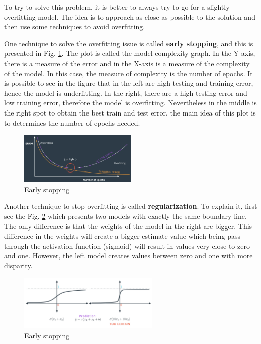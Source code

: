 \documentclass{article}
\begin{document}
To try to solve this problem, it is better to always try to go for a slightly overfitting model. The idea is to approach as close as possible to the solution and then use some techniques to avoid overfitting.

One technique to solve the overfitting issue is called \textbf{early stopping}, and this is presented in Fig. \ref{fig:f36}. The plot is called the model complexity graph. In the Y-axis, there is a measure of the error and in the X-axis is a measure of the complexity of the model. In this case, the measure of complexity is the number of epochs. It is possible to see in the figure that in the left are high testing and training error, hence the model is underfitting. In the right, there are a high testing error and low training error, therefore the model is overfitting. Nevertheless in the middle is the right spot to obtain the best train and test error, the main idea of this plot is to determines the number of epochs needed.

\begin{figure}[ht]
    \centering
    \includegraphics[width=0.5\textwidth,height=0.5\textheight,keepaspectratio]{images/early.png}
    \captionsetup{justification=centering}
    \caption{Early stopping}
    \label{fig:f36}
\end{figure}

Another technique to stop overfitting is called \textbf{regularization}. To explain it, first see the Fig. \ref{fig:f37} which presents two models with exactly the same boundary line. The only difference is that the weights of the model in the right are bigger. This difference in the weights will create a bigger estimate value which being pass through the activation function (sigmoid) will result in values very close to zero and one. However, the left model creates values between zero and one with more disparity. 

\begin{figure}[ht]
    \centering
    \includegraphics[width=0.6\textwidth,height=0.6\textheight,keepaspectratio]{images/regularization.png}
    \captionsetup{justification=centering}
    \caption{Early stopping}
    \label{fig:f37}
\end{figure}
\end{document}
